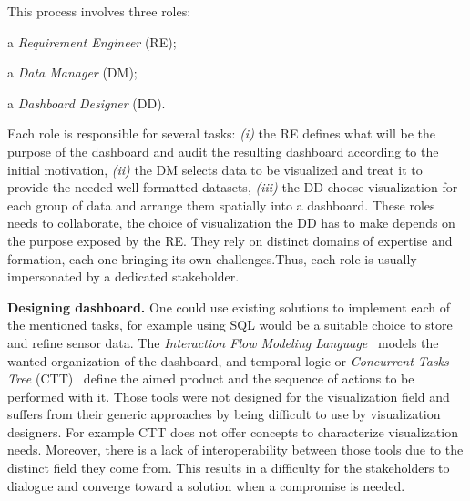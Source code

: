 \documentclass{acm_proc_article-sp}
\begin{document}
This process involves three roles: \begin{myenumerate}
\item a \emph{Requirement Engineer} (RE);
\item a \emph{Data Manager} (DM);
\item a \emph{Dashboard Designer} (DD).
\end{myenumerate}
Each role is responsible for several tasks: \emph{(i)} the RE defines what
will be the purpose of the dashboard and audit the resulting dashboard
according to the initial motivation, \emph{(ii)} the DM selects data to be
visualized and treat it to provide the needed well formatted
datasets, \emph{(iii)} the DD choose visualization for each group of data and
arrange them spatially into a dashboard.
These roles needs to collaborate, \eg the choice of visualization the
DD has to make depends on the purpose exposed by the RE. They rely
on distinct domains of expertise and formation, each one bringing its
own challenges.Thus, each role is usually impersonated by a
dedicated stakeholder.  

\textbf{Designing dashboard.}
One could use existing solutions to implement each of the mentioned
tasks, for example using SQL would be a suitable choice to store and
refine sensor data. The \emph{Interaction Flow Modeling
  Language}~\cite{ifml} models the wanted organization of the
dashboard, and temporal logic or \emph{Concurrent Tasks Tree}
(CTT)~\cite{ctt} define the aimed product and the sequence of actions
to be performed with it.
Those tools were not designed for the visualization field and suffers
from their generic approaches by being difficult to use by
visualization designers. For example CTT does not offer concepts to
characterize visualization needs.
Moreover, there is a lack of interoperability between those tools due
to the distinct field they come from. This results in a difficulty for
the stakeholders to dialogue and converge toward a solution when a
compromise is needed.
\end{document}
